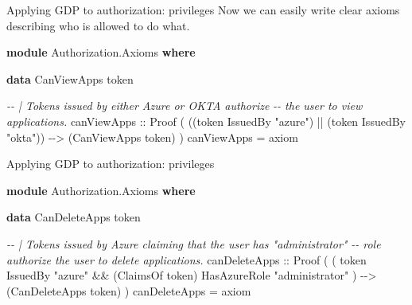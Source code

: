 \documentclass[
  9pt,
  ignorenonframetext,
]{beamer}
\newenvironment{Shaded}{}{}
\newcommand{\CommentTok}[1]{\textcolor[rgb]{0.38,0.63,0.69}{\textit{#1}}}
\newcommand{\DataTypeTok}[1]{\textcolor[rgb]{0.56,0.13,0.00}{#1}}
\newcommand{\KeywordTok}[1]{\textcolor[rgb]{0.00,0.44,0.13}{\textbf{#1}}}
\newcommand{\NormalTok}[1]{#1}
\newcommand{\OperatorTok}[1]{\textcolor[rgb]{0.40,0.40,0.40}{#1}}
\newcommand{\OtherTok}[1]{\textcolor[rgb]{0.00,0.44,0.13}{#1}}
\newcommand{\StringTok}[1]{\textcolor[rgb]{0.25,0.44,0.63}{#1}}
\begin{document}
\begin{frame}[fragile]{Applying GDP to authorization: privileges}
\protect\hypertarget{applying-gdp-to-authorization-privileges}{}
Now we can easily write clear axioms describing who is allowed to do
what.

\begin{Shaded}
\begin{Highlighting}[]
\KeywordTok{module} \DataTypeTok{Authorization.Axioms} \KeywordTok{where}

\KeywordTok{data} \DataTypeTok{CanViewApps}\NormalTok{ token}

\CommentTok{{-}{-} | Tokens issued by either Azure or OKTA authorize }
\CommentTok{{-}{-} the user to view applications.}
\OtherTok{canViewApps ::}
  \DataTypeTok{Proof}\NormalTok{ (}
\NormalTok{    ((token }\OtherTok{\textasciigrave{}IssuedBy\textasciigrave{}} \StringTok{"azure"}\NormalTok{) }\OperatorTok{||}\NormalTok{ (token }\OtherTok{\textasciigrave{}IssuedBy\textasciigrave{}} \StringTok{"okta"}\NormalTok{))}
    \OperatorTok{{-}{-}\textgreater{}}
\NormalTok{    (}\DataTypeTok{CanViewApps}\NormalTok{ token)}
\NormalTok{  )}
\NormalTok{canViewApps }\OtherTok{=}\NormalTok{ axiom}
\end{Highlighting}
\end{Shaded}




\end{frame}

\begin{frame}[fragile]{Applying GDP to authorization: privileges}
\protect\hypertarget{applying-gdp-to-authorization-privileges-1}{}
\begin{Shaded}
\begin{Highlighting}[]
\KeywordTok{module} \DataTypeTok{Authorization.Axioms} \KeywordTok{where}

\KeywordTok{data} \DataTypeTok{CanDeleteApps}\NormalTok{ token}

\CommentTok{{-}{-} | Tokens issued by Azure claiming that the user has "administrator" }
\CommentTok{{-}{-} role authorize the user to delete applications.}
\OtherTok{canDeleteApps ::}
  \DataTypeTok{Proof}\NormalTok{ (}
\NormalTok{    ( token }\OtherTok{\textasciigrave{}IssuedBy\textasciigrave{}} \StringTok{"azure"} 
      \OperatorTok{\&\&}\NormalTok{ (}\DataTypeTok{ClaimsOf}\NormalTok{ token) }\OtherTok{\textasciigrave{}HasAzureRole\textasciigrave{}} \StringTok{"administrator"}
\NormalTok{    )}
    \OperatorTok{{-}{-}\textgreater{}}
\NormalTok{    (}\DataTypeTok{CanDeleteApps}\NormalTok{ token)}
\NormalTok{  )}
\NormalTok{canDeleteApps }\OtherTok{=}\NormalTok{ axiom}
\end{Highlighting}
\end{Shaded}


\end{frame}
\end{document}
